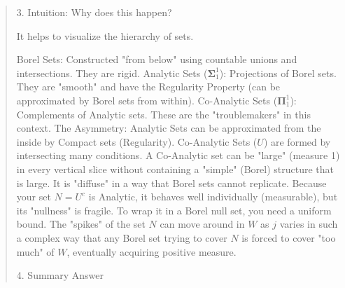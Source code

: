 \begin{Rem}
{\begin{quote}
3. Intuition: Why does this happen?

It helps to visualize the hierarchy of sets.

Borel Sets: Constructed "from below" using countable unions and intersections. They are rigid.
Analytic Sets ($\mathbf{\Sigma}^1_1$): Projections of Borel sets. They are "smooth" and have the Regularity Property (can be approximated by Borel sets from within).
Co-Analytic Sets ($\mathbf{\Pi}^1_1$): Complements of Analytic sets. These are the "troublemakers" in this context.
The Asymmetry:
Analytic Sets can be approximated from the inside by Compact sets (Regularity).
Co-Analytic Sets ($U$) are formed by intersecting many conditions. A Co-Analytic set can be "large" (measure 1) in every vertical slice without containing a "simple" (Borel) structure that is large. It is "diffuse" in a way that Borel sets cannot replicate.
Because your set $N = U^c$ is Analytic, it behaves well individually (measurable), but its "nullness" is fragile. To wrap it in a Borel null set, you need a uniform bound. The "spikes" of the set $N$ can move around in $W$ as $j$ varies in such a complex way that any Borel set trying to cover $N$ is forced to cover "too much" of $W$, eventually acquiring positive measure.

4. Summary Answer


\end{quote}}
\end{Rem}
